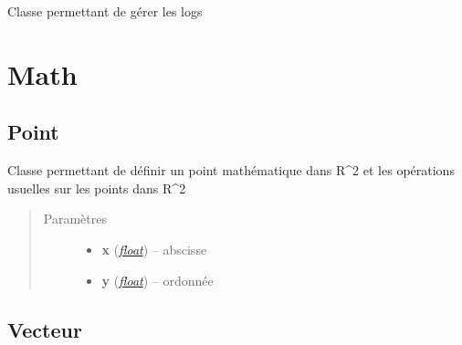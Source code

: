 \documentclass[letterpaper,10pt,french]{sphinxmanual}
\begin{document}
\begin{fulllineitems}
\label{log:lib.log.Log}
Classe permettant de gérer les logs

\end{fulllineitems}



\chapter{Math}
\label{math::doc}\label{math:math}

\section{Point}
\label{math:point}\label{math:module-lib.math.point}

\begin{fulllineitems}
\label{math:lib.math.point.Point}
Classe permettant de définir un point mathématique dans R\textasciicircum{}2 et les opérations usuelles sur les points dans R\textasciicircum{}2
\begin{quote}\begin{description}
\item[{Paramètres}] \leavevmode\begin{itemize}
\item {} 
\textbf{x} (\href{http://docs.python.org/library/functions.html\#float}{\emph{float}}) -- abscisse

\item {} 
\textbf{y} (\href{http://docs.python.org/library/functions.html\#float}{\emph{float}}) -- ordonnée

\end{itemize}

\end{description}\end{quote}

\end{fulllineitems}



\section{Vecteur}
\label{math:module-lib.math.vecteur}\label{math:vecteur}
\end{document}
